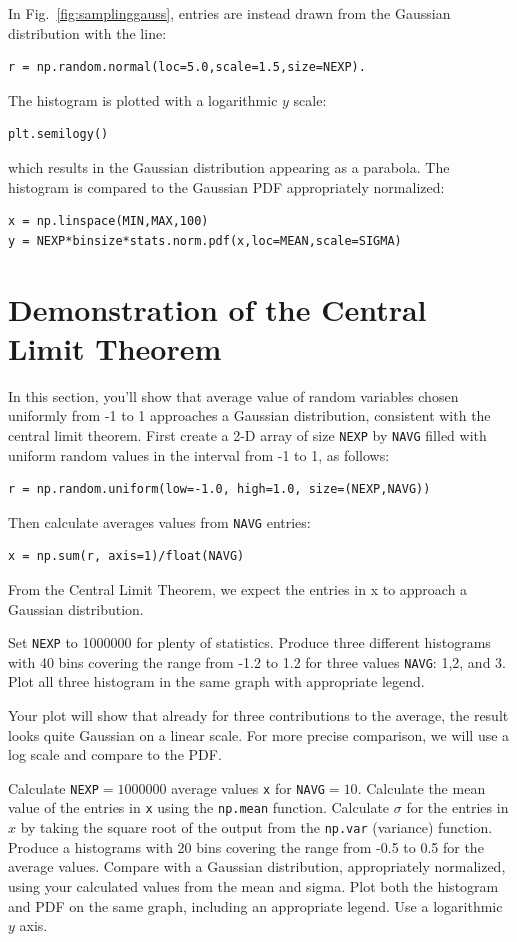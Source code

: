 In Fig.~\ref{fig:samplinggauss}, entries are instead drawn from the Gaussian distribution with the line:
\begin{verbatim}
r = np.random.normal(loc=5.0,scale=1.5,size=NEXP).
\end{verbatim}
The histogram is plotted with a logarithmic $y$ scale:
\begin{verbatim}
plt.semilogy()
\end{verbatim}
which results in the Gaussian distribution appearing as a parabola.  The histogram is compared to the Gaussian PDF appropriately normalized:
\begin{verbatim}
x = np.linspace(MIN,MAX,100)
y = NEXP*binsize*stats.norm.pdf(x,loc=MEAN,scale=SIGMA)
\end{verbatim}


\section{Demonstration of the Central Limit Theorem}

In this section, you'll show that average value of random variables
chosen uniformly from -1 to 1 approaches a Gaussian distribution,
consistent with the central limit theorem.  First create a 2-D array
of size {\tt NEXP} by {\tt NAVG} filled with uniform random values in
the interval from -1 to 1, as follows:
\begin{verbatim}
r = np.random.uniform(low=-1.0, high=1.0, size=(NEXP,NAVG))
\end{verbatim}
Then calculate averages values from {\tt NAVG} entries:
\begin{verbatim}
x = np.sum(r, axis=1)/float(NAVG)  
\end{verbatim}
From the Central Limit Theorem, we expect the entries in x to approach a Gaussian distribution.

\begin{plot}  Set {\tt NEXP} to 1000000 for plenty of statistics.
Produce three different histograms with 40 bins covering the range
from -1.2 to 1.2 for three values {\tt NAVG}: 1,2, and 3.  Plot all
three histogram in the same graph with appropriate legend. \end{plot}

Your plot will show that already for three contributions to the average, the result looks quite Gaussian on a linear scale.  For more precise comparison, we will use a log scale and compare to the PDF.

\begin{plot} Calculate {\tt NEXP}$=1000000$ average values {\tt x} for {\tt NAVG}$=10$.  Calculate the mean value of the entries in {\tt x} using the {\tt np.mean} function.  Calculate $\sigma$ for the entries in $x$ by taking the square root of the output from the {\tt np.var} (variance) function.  Produce a histograms with 20 bins covering the range
from -0.5 to 0.5 for the average values.  Compare with a Gaussian distribution, appropriately normalized, using your calculated values from the  mean and sigma.  Plot both the histogram and PDF on the same graph, including an appropriate legend.  Use a logarithmic $y$ axis. \end{plot}

